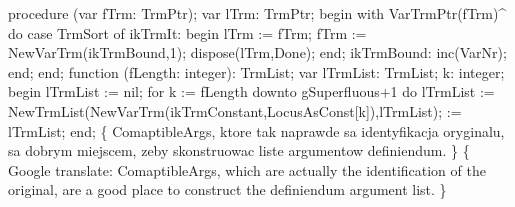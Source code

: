 \nwenddocs{}\endmoddef\nwstartdeflinemarkup{}\nwenddeflinemarkup
procedure (var fTrm: TrmPtr);
var
   lTrm: TrmPtr;
begin
   with VarTrmPtr(fTrm)^ do
      case TrmSort of
         ikTrmIt:
            begin
               lTrm := fTrm;
               fTrm := NewVarTrm(ikTrmBound,1);
               dispose(lTrm,Done);
            end;
         ikTrmBound: inc(VarNr);
      end;
end;
\eatline
{}\nwendcode{}\nwdocspar
\nwenddocs{}\endmoddef\nwstartdeflinemarkup{}\nwenddeflinemarkup
function (fLength: integer): TrmList;
var
   lTrmList: TrmList;
   k: integer;
begin
   lTrmList := nil;
   for k := fLength downto gSuperfluous+1 do
      lTrmList := NewTrmList(NewVarTrm(ikTrmConstant,LocusAsConst[k]),lTrmList);
    := lTrmList;
end;
\eatline
{}\nwendcode{}\nwdocspar
\nwenddocs{}\endmoddef\nwstartdeflinemarkup{}\nwenddeflinemarkup
\{ ComaptibleArgs, ktore tak naprawde sa identyfikacja oryginalu, sa
  dobrym miejscem, zeby skonstruowac liste argumentow definiendum.
\}
\{ Google translate:
  ComaptibleArgs, which are actually the identification of the original,
  are a good place to construct the definiendum argument list. \}

